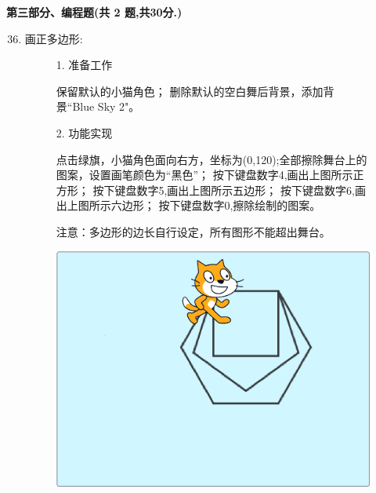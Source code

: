 \documentclass[10pt, a4paper]{article}
\begin{document}
    \newpage
    {\noindent \textbf{第三部分、编程题(共 2 题,共30分.)}}
    \begin{enumerate}
        \setcounter{enumi}{35}
        
        \item 画正多边形:
        \begin{figure}[htbp]
            \begin{minipage}{.6\textwidth}
                1. 准备工作
                \begin{tasks}[label = (\arabic*)]
                    \task 保留默认的小猫角色；
                    \task 删除默认的空白舞后背景，添加背景“Blue Sky 2"。
                \end{tasks}
                2. 功能实现
                \begin{tasks}[label = (\arabic*)]
                    \task 点击绿旗，小猫角色面向右方，坐标为(0,120);全部擦除舞台上的图案，设置画笔颜色为“黑色”；
                    \task 按下键盘数字4,画出上图所示正方形；
                    \task 按下键盘数字5,画出上图所示五边形；
                    \task 按下键盘数字6,画出上图所示六边形；
                    \task 按下键盘数字0,擦除绘制的图案。
                    
                    注意：多边形的边长自行设定，所有图形不能超出舞台。
                \end{tasks}
            \end{minipage}
            \begin{minipage}{.37\textwidth}
                \centering
                \includegraphics[width=.8\textwidth]{36.png}
            \end{minipage}
        \end{figure}


\end{enumerate}
\end{document}
